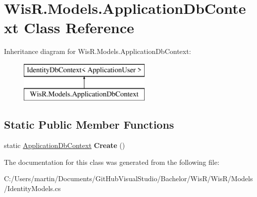 \hypertarget{class_wis_r_1_1_models_1_1_application_db_context}{}\section{Wis\+R.\+Models.\+Application\+Db\+Context Class Reference}
\label{class_wis_r_1_1_models_1_1_application_db_context}
Inheritance diagram for Wis\+R.\+Models.\+Application\+Db\+Context\+:\begin{figure}[H]
\begin{center}
\leavevmode
\includegraphics[height=2.000000cm]{class_wis_r_1_1_models_1_1_application_db_context}
\end{center}
\end{figure}
\subsection*{Static Public Member Functions}
\begin{DoxyCompactItemize}
\item 
\hypertarget{class_wis_r_1_1_models_1_1_application_db_context_ad79662013077aaabd3428a8d38f46fd4}{}static \hyperlink{class_wis_r_1_1_models_1_1_application_db_context}{Application\+Db\+Context} {\bfseries Create} ()\label{class_wis_r_1_1_models_1_1_application_db_context_ad79662013077aaabd3428a8d38f46fd4}

\end{DoxyCompactItemize}


The documentation for this class was generated from the following file\+:\begin{DoxyCompactItemize}
\item 
C\+:/\+Users/martin/\+Documents/\+Git\+Hub\+Visual\+Studio/\+Bachelor/\+Wis\+R/\+Wis\+R/\+Models/Identity\+Models.\+cs\end{DoxyCompactItemize}
